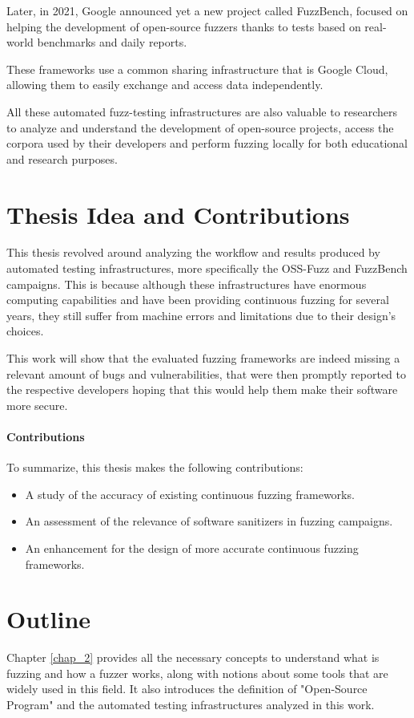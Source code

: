 Later, in 2021, Google announced yet a new project called FuzzBench, focused on helping the development of open-source fuzzers thanks to tests based on real-world benchmarks and daily reports.

These frameworks use a common sharing infrastructure that is Google Cloud, allowing them to easily exchange and access data independently.

All these automated fuzz-testing infrastructures are also valuable to researchers to analyze and understand the development of open-source projects, access the corpora used by their developers and perform fuzzing locally for both educational and research purposes. 





\section{Thesis Idea and Contributions}
This thesis revolved around analyzing the workflow and results produced by automated testing infrastructures, more specifically the OSS-Fuzz and FuzzBench campaigns. This is because although these infrastructures have enormous computing capabilities and have been providing continuous fuzzing for several years, they still suffer from machine errors and limitations due to their design's choices.

This work will show that the evaluated fuzzing frameworks are indeed missing a relevant amount of bugs and vulnerabilities, that were then promptly reported to the respective developers hoping that this would help them make their software more secure. 



\paragraph{Contributions}
To summarize, this thesis makes the following contributions:
\begin{itemize}
    \item A study of the accuracy of existing continuous fuzzing frameworks.
    \item An assessment of the relevance of software sanitizers in fuzzing campaigns.
    \item An enhancement for the design of more accurate continuous fuzzing frameworks.
\end{itemize}



\section{Outline}
Chapter \ref{chap_2} provides all the necessary concepts to understand what is fuzzing and how a fuzzer works, along with notions about some tools that are widely used in this field. It also introduces the definition of "Open-Source Program" and the automated testing infrastructures analyzed in this work.

